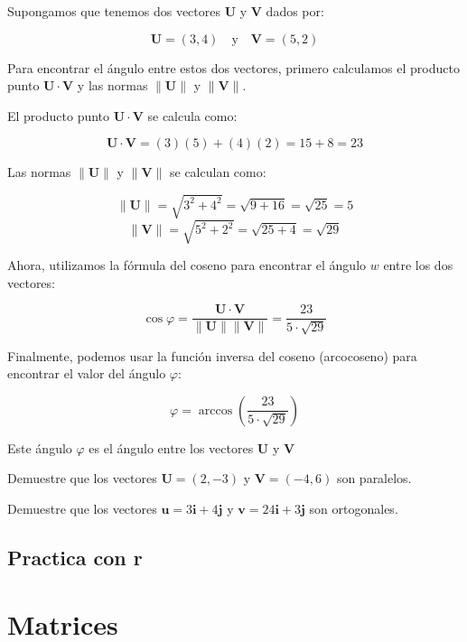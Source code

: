 \begin{example}
 
Supongamos que tenemos dos vectores $\boldsymbol{U}$ y $\boldsymbol{V}$ dados por:

\[
\boldsymbol{U} = (3, 4) \quad \text{y} \quad \boldsymbol{V} = (5, 2)
\]

Para encontrar el ángulo entre estos dos vectores, primero calculamos el producto punto $\boldsymbol{U} \cdot \boldsymbol{V}$ y las normas $\|\boldsymbol{U}\|$ y $\|\boldsymbol{V}\|$.

El producto punto $\boldsymbol{U} \cdot \boldsymbol{V}$ se calcula como:

\[
\boldsymbol{U} \cdot \boldsymbol{V} = (3)(5) + (4)(2) = 15 + 8 = 23
\]

Las normas $\|\boldsymbol{U}\|$ y $\|\boldsymbol{V}\|$ se calculan como:

\[
\|\boldsymbol{U}\| = \sqrt{3^2 + 4^2} = \sqrt{9 + 16} = \sqrt{25} = 5
\]
\[
\|\boldsymbol{V}\| = \sqrt{5^2 + 2^2} = \sqrt{25 + 4} = \sqrt{29}
\]

Ahora, utilizamos la fórmula del coseno para encontrar el ángulo $w$ entre los dos vectores:

\[
\cos \varphi = \frac{\boldsymbol{U} \cdot \boldsymbol{V}}{\|\boldsymbol{U}\| \|\boldsymbol{V}\|} = \frac{23}{5 \cdot \sqrt{29}}
\]

Finalmente, podemos usar la función inversa del coseno (arcocoseno) para encontrar el valor del ángulo $\varphi$:

\[
\varphi = \arccos\left(\frac{23}{5 \cdot \sqrt{29}}\right)
\]

Este ángulo $\varphi$ es el ángulo entre los vectores $\boldsymbol{U}$ y $\boldsymbol{V}$   
\end{example}
\begin{exercise}
Demuestre que los vectores $\boldsymbol{U}=(2,-3)$ y $\boldsymbol{V}=(-4, 6)$ son paralelos.    
\end{exercise}
\begin{exercise}
Demuestre que los vectores $\mathbf{u} = 3\mathbf{i} + 4\mathbf{j}$ y $\mathbf{v} = 24\mathbf{i} + 3\mathbf{j}$ son ortogonales.    
\end{exercise}
\subsection{Practica con r}



\section{Matrices}

